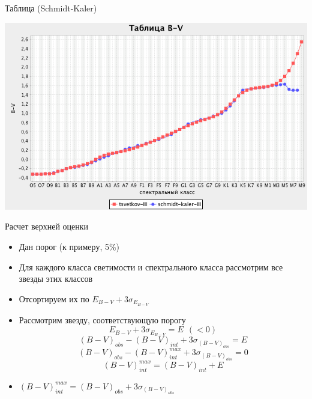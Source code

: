 \documentclass[14pt, fleqn, xcolor={dvipsnames, table}]{beamer}
\begin{document}
        \begin{frame}{Таблица (Schmidt-Kaler)}
            \begin{center}
                \includegraphics[scale=0.49]{table-sk.png}
            \end{center}
        \end{frame} 
        
        \begin{frame}{Расчет верхней оценки}
            \begin{itemize}
            		\item Дан порог (к примеру, 5\%)
            		\item Для каждого класса светимости и спектрального класса рассмотрим все звезды этих классов
            		\item Отсортируем их по $E_{B - V} + 3 \sigma_{E_{B - V}}$
            		\item Рассмотрим звезду, соответствующую порогу
            			$$E_{B - V} + 3 \sigma_{E_{B - V}} = E ~~ (< 0)$$
            			$$(B - V)_{obs} - (B - V)_{int} + 3 \sigma_{(B - V)_{obs}} = E$$
            			$$(B - V)_{obs} - (B - V)^{max}_{int} + 3 \sigma_{(B - V)_{obs}} = 0$$
            			$$(B - V)^{max}_{int} = (B - V)_{int} + E$$
            		\item $(B - V)^{max}_{int} = (B - V)_{obs} + 3 \sigma_{(B - V)_{obs}}$
            \end{itemize}
           
        \end{frame} 
        
\end{document}

